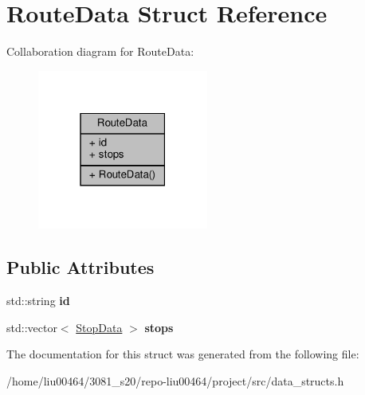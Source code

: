 \hypertarget{structRouteData}{}\section{Route\+Data Struct Reference}
\label{structRouteData}


Collaboration diagram for Route\+Data\+:\nopagebreak
\begin{figure}[H]
\begin{center}
\leavevmode
\includegraphics[width=159pt]{structRouteData__coll__graph}
\end{center}
\end{figure}
\subsection*{Public Attributes}
\begin{DoxyCompactItemize}
\item 
\mbox{\label{structRouteData_a578af871a15d4737ab8d2074887da85f}} 
std\+::string {\bfseries id}
\item 
\mbox{\label{structRouteData_af867789789fbcfe97bdd554e56b121bf}} 
std\+::vector$<$ \hyperlink{structStopData}{Stop\+Data} $>$ {\bfseries stops}
\end{DoxyCompactItemize}


The documentation for this struct was generated from the following file\+:\begin{DoxyCompactItemize}
\item 
/home/liu00464/3081\+\_\+s20/repo-\/liu00464/project/src/data\+\_\+structs.\+h\end{DoxyCompactItemize}
